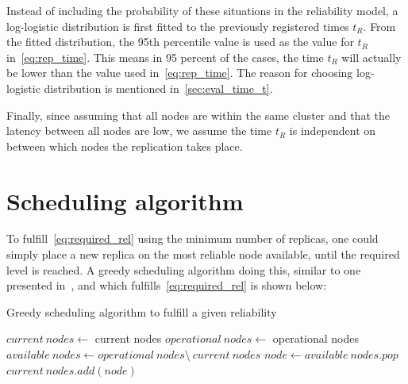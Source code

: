 \documentclass{cslthse-msc}
\begin{document}
Instead of including the probability of these situations in the reliability model, a log-logistic distribution is first fitted to the previously registered times $t_R$. From the fitted distribution, the 95th percentile value is used as the value for $t_R$ in~\cref{eq:rep_time}. This means in 95 percent of the cases, the time $t_R$ will actually be lower than the value used in~\cref{eq:rep_time}. The reason for choosing log-logistic distribution is mentioned in~\cref{sec:eval_time_t}.

Finally, since assuming that all nodes are within the same cluster and that the latency between all nodes are low, we assume the time $t_R$ is independent on between which nodes the replication takes place. 

\section{Scheduling algorithm} \label{sec:design_sched_alg}
To fulfill~\cref{eq:required_rel} using the minimum number of replicas, one could simply place a new replica on the most reliable node available, until the required level is reached. A greedy scheduling algorithm doing this, similar to one presented in~\cite{effTaskReplMobGrid}, and which fulfills~\cref{eq:required_rel} is shown below:


\begin{algorithm}[H]
	\caption{Greedy scheduling algorithm to fulfill a given reliability} \label{alg:scheduling}
	\begin{algorithmic}[1]
	\Statex
	\State $current\ nodes\gets$ current nodes
	\State $operational\ nodes\gets $ operational nodes
	\State $available\ nodes\gets operational\ nodes \setminus \ current\ nodes$
	\State
		\State $node\gets available\ nodes.pop$
		\State
		\State $current\ nodes.add(node)$	%
	\EndWhile
	\EndProcedure
	\end{algorithmic}
\end{algorithm} 
\end{document}
